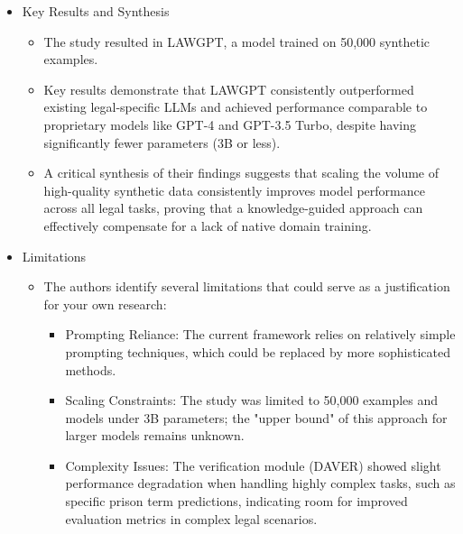 \begin{itemize}
  \item Key Results and Synthesis
  \begin{itemize}
    \item The study resulted in LAWGPT, a model trained on 50,000 synthetic examples.
    \item Key results demonstrate that LAWGPT consistently outperformed existing legal-specific LLMs and achieved performance comparable to proprietary models like GPT-4 and GPT-3.5 Turbo, despite having significantly fewer parameters (3B or less).
    \item A critical synthesis of their findings suggests that scaling the volume of high-quality synthetic data consistently improves model performance across all legal tasks, proving that a knowledge-guided approach can effectively compensate for a lack of native domain training.
  \end{itemize}

  \item Limitations
  \begin{itemize}
    \item The authors identify several limitations that could serve as a justification for your own research:
    \begin{itemize}
      \item Prompting Reliance: The current framework relies on relatively simple prompting techniques, which could be replaced by more sophisticated methods.
      \item Scaling Constraints: The study was limited to 50,000 examples and models under 3B parameters; the "upper bound" of this approach for larger models remains unknown.
      \item Complexity Issues: The verification module (DAVER) showed slight performance degradation when handling highly complex tasks, such as specific prison term predictions, indicating room for improved evaluation metrics in complex legal scenarios.
    \end{itemize}
  \end{itemize}
\end{itemize}




